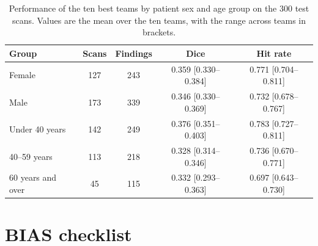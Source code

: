 \documentclass[final,5p,times,twocolumn,authoryear,numafflabel]{elsarticle}
\begin{document}
\begin{table}[!htbp]
\centering
\caption{Performance of the ten best teams by patient sex and age group on the
300 test scans. Values are the mean over the ten teams, with the range across
teams in brackets.}
\label{tab:sexage}
\renewcommand{\baselinestretch}{1}\footnotesize
\setlength{\tabcolsep}{1.5pt}
\renewcommand{\arraystretch}{1.2}
\begin{tabular}{lcccc}
\toprule
Group & Scans & Findings & Dice & Hit rate \\
\midrule
Female & 127 & 243 & 0.359 {\scriptsize[0.330--0.384]} & 0.771 {\scriptsize[0.704--0.811]} \\
Male & 173 & 339 & 0.346 {\scriptsize[0.330--0.369]} & 0.732 {\scriptsize[0.678--0.767]} \\
\midrule
Under 40 years & 142 & 249 & 0.376 {\scriptsize[0.351--0.403]} & 0.783 {\scriptsize[0.727--0.811]} \\
40--59 years & 113 & 218 & 0.328 {\scriptsize[0.314--0.346]} & 0.736 {\scriptsize[0.670--0.771]} \\
60 years and over & 45 & 115 & 0.332 {\scriptsize[0.293--0.363]} & 0.697 {\scriptsize[0.643--0.730]} \\
\bottomrule
\end{tabular}
\end{table}

\section{BIAS checklist}
\label{app:bias}

\end{document}

